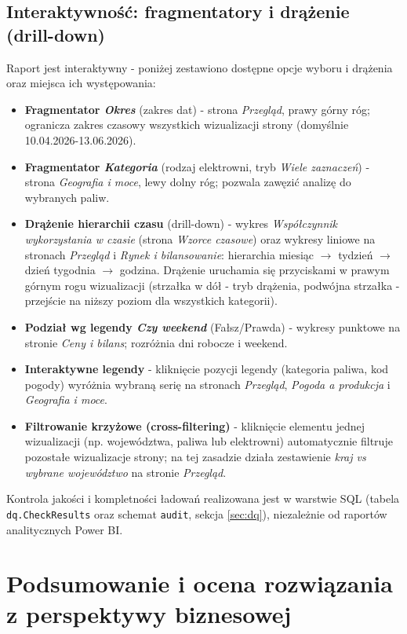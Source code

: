 \documentclass[12pt]{article}
\begin{document}
	\subsection{Interaktywność: fragmentatory i drążenie (drill-down)}
	Raport jest interaktywny - poniżej zestawiono dostępne opcje wyboru i drążenia oraz miejsca ich występowania:
	\begin{itemize}
		\item \textbf{Fragmentator \textit{Okres}} (zakres dat) - strona \textit{Przegląd}, prawy górny róg; ogranicza zakres czasowy wszystkich wizualizacji strony (domyślnie 10.04.2026-13.06.2026).
		\item \textbf{Fragmentator \textit{Kategoria}} (rodzaj elektrowni, tryb \textit{Wiele zaznaczeń}) - strona \textit{Geografia i moce}, lewy dolny róg; pozwala zawęzić analizę do wybranych paliw.
		\item \textbf{Drążenie hierarchii czasu} (drill-down) - wykres \textit{Współczynnik wykorzystania w czasie} (strona \textit{Wzorce czasowe}) oraz wykresy liniowe na stronach \textit{Przegląd} i \textit{Rynek i bilansowanie}: hierarchia miesiąc $\rightarrow$ tydzień $\rightarrow$ dzień tygodnia $\rightarrow$ godzina. Drążenie uruchamia się przyciskami w prawym górnym rogu wizualizacji (strzałka w dół - tryb drążenia, podwójna strzałka - przejście na niższy poziom dla wszystkich kategorii).
		\item \textbf{Podział wg legendy \textit{Czy weekend}} (Fałsz/Prawda) - wykresy punktowe na stronie \textit{Ceny i bilans}; rozróżnia dni robocze i weekend.
		\item \textbf{Interaktywne legendy} - kliknięcie pozycji legendy (kategoria paliwa, kod pogody) wyróżnia wybraną serię na stronach \textit{Przegląd}, \textit{Pogoda a produkcja} i \textit{Geografia i moce}.
		\item \textbf{Filtrowanie krzyżowe (cross-filtering)} - kliknięcie elementu jednej wizualizacji (np. województwa, paliwa lub elektrowni) automatycznie filtruje pozostałe wizualizacje strony; na tej zasadzie działa zestawienie \textit{kraj vs wybrane województwo} na stronie \textit{Przegląd}.
	\end{itemize}

	\medskip
	\noindent Kontrola jakości i kompletności ładowań realizowana jest w warstwie SQL (tabela \texttt{dq.CheckResults} oraz schemat \texttt{audit}, sekcja \ref{sec:dq}), niezależnie od raportów analitycznych Power BI.

	\section{Podsumowanie i ocena rozwiązania z perspektywy biznesowej}
\end{document}
